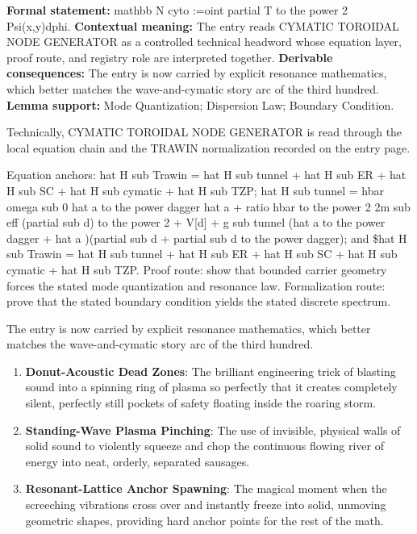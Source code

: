 \begingroup\footnotesize\setlength{\emergencystretch}{3em}\sloppy
\textbf{Formal statement:} mathbb N cyto :=oint partial T to the power 2 Psi(x,y)dphi. \textbf{Contextual meaning:} The entry reads CYMATIC TOROIDAL NODE GENERATOR as a controlled technical headword whose equation layer, proof route, and registry role are interpreted together. \textbf{Derivable consequences:} The entry is now carried by explicit resonance mathematics, which better matches the wave-and-cymatic story arc of the third hundred. \textbf{Lemma support:} Mode Quantization; Dispersion Law; Boundary Condition.\par
\endgroup

Technically, CYMATIC TOROIDAL NODE GENERATOR is read through the local equation chain and the TRAWIN normalization recorded on the entry page.

Equation anchors: hat H sub Trawin = hat H sub tunnel + hat H sub ER + hat H sub SC + hat H sub cymatic + hat H sub TZP; hat H sub tunnel = hbar omega sub 0 hat a to the power dagger hat a + ratio hbar to the power 2 2m sub eff (partial sub d) to the power 2 + V[d] + g sub tunnel (hat a to the power dagger + hat a )(partial sub d + partial sub d to the power dagger); and \$hat H sub Trawin = hat H sub tunnel + hat H sub ER + hat H sub SC + hat H sub cymatic + hat H sub TZP. Proof route: show that bounded carrier geometry forces the stated mode quantization and resonance law. Formalization route: prove that the stated boundary condition yields the stated discrete spectrum.

The entry is now carried by explicit resonance mathematics, which better matches the wave-and-cymatic story arc of the third hundred.
\endgroup

\begin{enumerate}[leftmargin=1.6em,itemsep=6pt,topsep=4pt]
\item \textbf{Donut-Acoustic Dead Zones}: The brilliant engineering trick of blasting sound into a spinning ring of plasma so perfectly that it creates completely silent, perfectly still pockets of safety floating inside the roaring storm.
\item \textbf{Standing-Wave Plasma Pinching}: The use of invisible, physical walls of solid sound to violently squeeze and chop the continuous flowing river of energy into neat, orderly, separated sausages.
\item \textbf{Resonant-Lattice Anchor Spawning}: The magical moment when the screeching vibrations cross over and instantly freeze into solid, unmoving geometric shapes, providing hard anchor points for the rest of the math.
\end{enumerate}

